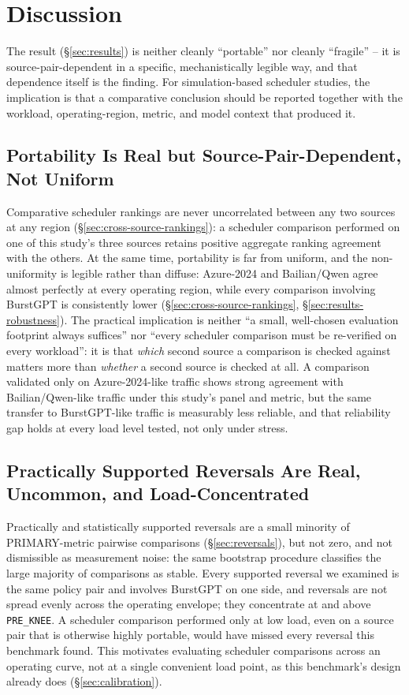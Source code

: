 \section{Discussion}
\label{sec:discussion}

The result (\S\ref{sec:results}) is neither cleanly ``portable'' nor
cleanly ``fragile'' -- it is source-pair-dependent in a specific,
mechanistically legible way, and that dependence itself is the finding.
For simulation-based scheduler studies, the implication is that a
comparative conclusion should be reported together with the workload,
operating-region, metric, and model context that produced it.

\subsection{Portability Is Real but Source-Pair-Dependent, Not Uniform}

Comparative scheduler rankings are never uncorrelated between any two
sources at any region (\S\ref{sec:cross-source-rankings}): a scheduler
comparison performed on one of this study's three sources retains
positive aggregate ranking agreement with the others. At the same time,
portability is far from uniform, and the non-uniformity is legible rather
than diffuse: Azure-2024 and Bailian/Qwen agree almost perfectly at every
operating region, while every comparison involving BurstGPT is consistently
lower (\S\ref{sec:cross-source-rankings},
\S\ref{sec:results-robustness}). The
practical implication is neither ``a small, well-chosen evaluation
footprint always suffices'' nor ``every scheduler comparison must be
re-verified on every workload'': it is that \emph{which} second source a
comparison is checked against matters more than \emph{whether} a second
source is checked at all. A comparison validated only on Azure-2024-like
traffic shows strong agreement with Bailian/Qwen-like traffic under
this study's panel and metric, but the same transfer to BurstGPT-like
traffic is measurably less reliable, and that reliability gap holds at
every load level tested, not only under stress.

\subsection{Practically Supported Reversals Are Real, Uncommon, and
Load-Concentrated}

Practically and statistically supported reversals are a small minority of
PRIMARY-metric pairwise comparisons (\S\ref{sec:reversals}), but not zero,
and not dismissible as measurement noise: the same bootstrap procedure
classifies the large majority of comparisons as stable. Every supported
reversal we examined is the same policy pair and involves BurstGPT on one
side, and reversals are not spread evenly across the operating envelope;
they concentrate at and above \texttt{PRE\_KNEE}. A scheduler comparison performed only at low load,
even on a source pair that is otherwise highly portable, would have missed
every reversal this benchmark found. This motivates evaluating scheduler
comparisons across an operating curve, not at a single convenient load
point, as this benchmark's design already does
(\S\ref{sec:calibration}).

